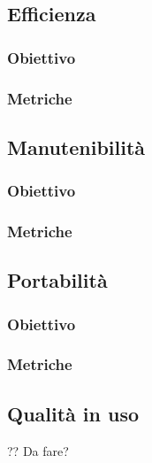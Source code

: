 \subsection{Efficienza}
\subsubsection{Obiettivo}
\subsubsection{Metriche}
\subsection{Manutenibilità}
\subsubsection{Obiettivo}
\subsubsection{Metriche}
\subsection{Portabilità}
\subsubsection{Obiettivo}
\subsubsection{Metriche}
\subsection{Qualità in uso} ?? Da fare?


